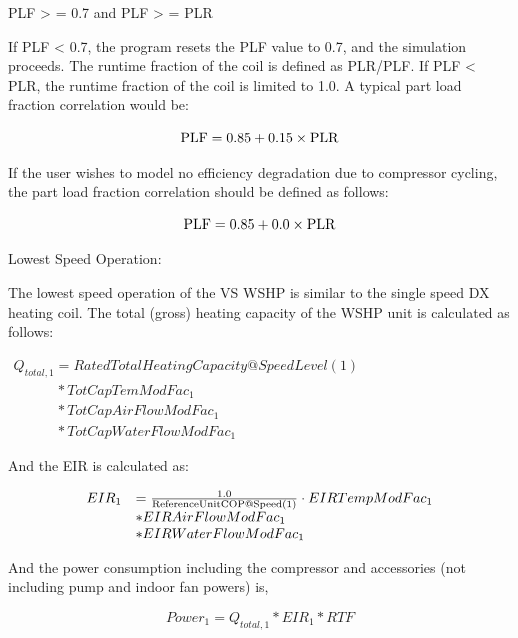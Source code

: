 PLF \textgreater{} = 0.7 and PLF \textgreater{} = PLR

If PLF \textless{} 0.7, the program resets the PLF value to 0.7, and the simulation proceeds. The runtime fraction of the coil is defined as PLR/PLF. If PLF \textless{} PLR, the runtime fraction of the coil is limited to 1.0. A typical part load fraction correlation would be:

\begin{equation}
{\rm{PLF}} = 0.85 + 0.15 \times {\rm{PLR}}
\end{equation}

If the user wishes to model no efficiency degradation due to compressor cycling, the part load fraction correlation should be defined as follows:

\begin{equation}
{\rm{PLF}} = 0.85 + 0.0 \times {\rm{PLR}}
\end{equation}

Lowest Speed Operation:

The lowest speed operation of the VS WSHP is similar to the single speed DX heating coil. The total (gross) heating capacity of the WSHP unit is calculated as follows:

\(\begin{array}{l}{Q_{total,1}} = RatedTotalHeatingCapacity@SpeedLevel\left( 1 \right)\\\quad \quad \quad *TotCapTemModFa{c_1}\\\quad \quad \quad *TotCapAirFlowModFa{c_1}\\\quad \quad \quad *TotCapWaterFlowModFa{c_1}\end{array}\) \emph{~}

And the EIR is calculated as:

\begin{equation}
  \begin{array}{rl}
    EIR_1 &= \frac{1.0}{\rm{ReferenceUnitCOP@Speed(1)}} \cdot EIRTempModFac_1 \\
          &* EIRAirFlowModFac_1 \\
          &* EIRWaterFlowModFac_1
  \end{array}
\end{equation}

And the power consumption including the compressor and accessories (not including pump and indoor fan powers) is,

\begin{equation}
Powe{r_1} = {Q_{total,1}}*EI{R_1}*RTF
\end{equation}

